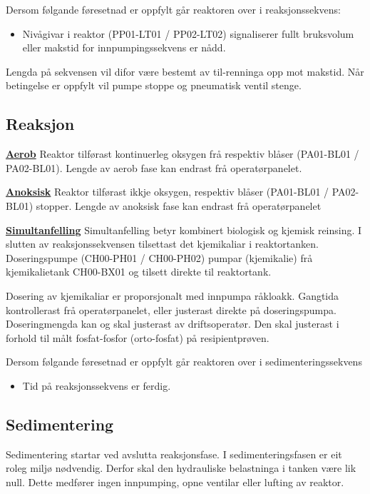 Dersom følgande føresetnad er oppfylt går reaktoren over i reaksjonssekvens:
\begin{itemize}
    \item Nivågivar i reaktor (PP01-LT01 / PP02-LT02) signaliserer fullt bruksvolum eller makstid for innpumpingssekvens er nådd.
\end{itemize}

Lengda på sekvensen vil difor være bestemt av til-renninga opp mot makstid.
Når betingelse er oppfylt vil pumpe stoppe og pneumatisk ventil stenge.

\subsection{Reaksjon}
\underline{\textbf{Aerob}} \newline
Reaktor tilførast kontinuerleg oksygen frå respektiv blåser (PA01-BL01 / PA02-BL01). Lengde av aerob fase kan endrast frå operatørpanelet.

\underline{\textbf{Anoksisk}} \newline
Reaktor tilførast ikkje oksygen, respektiv blåser (PA01-BL01 / PA02-BL01) stopper. Lengde av anoksisk fase kan endrast frå operatørpanelet

\underline{\textbf{Simultanfelling}} \newline
Simultanfelling betyr kombinert biologisk og kjemisk reinsing. I slutten av reaksjonssekvensen tilsettast det kjemikaliar i reaktortanken. 
Doseringspumpe (CH00-PH01 / CH00-PH02) pumpar (kjemikalie) frå kjemikalietank CH00-BX01 og tilsett direkte til reaktortank.

Dosering av kjemikaliar er proporsjonalt med innpumpa råkloakk. Gangtida kontrollerast frå operatørpanelet, eller justerast direkte på doseringspumpa. 
Doseringmengda kan og skal justerast av driftsoperatør. Den skal justerast i forhold til målt fosfat-fosfor (orto-fosfat) på resipientprøven.

Dersom følgande føresetnad er oppfylt går reaktoren over i sedimenteringssekvens
\begin{itemize}
    \item Tid på reaksjonssekvens er ferdig.
\end{itemize}

\subsection{Sedimentering}
Sedimentering startar ved avslutta reaksjonsfase. I sedimenteringsfasen er eit roleg miljø nødvendig. Derfor skal den hydrauliske belastninga i tanken være lik null.
Dette medfører ingen innpumping, opne ventilar eller lufting av reaktor.

